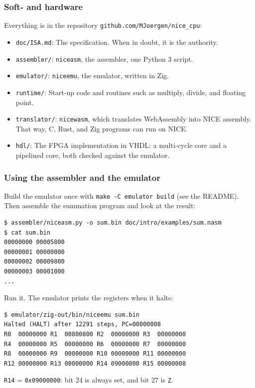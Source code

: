 \documentclass{beamer}
\newcommand{\code}[1]{\texttt{#1}}
\begin{document}
%
  \begin{frame}
   \frametitle{Soft- and hardware}
   Everything is in the repository \code{github.com/MJoergen/nice\_cpu}:
   \begin{itemize}
    \item \code{doc/ISA.md}: The specification. When in doubt, it is
     the authority.
    \item \code{assembler/}: \code{niceasm}, the assembler, one Python 3
     script.
    \item \code{emulator/}: \code{niceemu}, the emulator, written in Zig.
    \item \code{runtime/}: Start-up code and routines such as multiply,
     divide, and floating point.
    \item \code{translator/}: \code{nicewasm}, which translates
     WebAssembly into NICE assembly. That way, C, Rust, and Zig programs
     can run on NICE.
    \item \code{hdl/}: The FPGA implementation in VHDL: a multi-cycle
     core and a pipelined core, both checked against the emulator.
   \end{itemize}
  \end{frame}
%
  \begin{frame}[fragile]
   \frametitle{Using the assembler and the emulator}
   Build the emulator once with \code{make -C emulator build} (see the
   README). Then assemble the summation program and look at the result:
   {\footnotesize
   \begin{verbatim}
$ assembler/niceasm.py -o sum.bin doc/intro/examples/sum.nasm
$ cat sum.bin
00000000 00005800
00000001 00000000
00000002 00009800
00000003 00001000
...
   \end{verbatim}
   }
   Run it. The emulator prints the registers when it halts:
   {\footnotesize
   \begin{verbatim}
$ emulator/zig-out/bin/niceemu sum.bin
Halted (HALT) after 12291 steps, PC=00000008
R0  00000000 R1  00800800 R2  00000000 R3  00000000
R4  00000000 R5  00000000 R6  00000000 R7  00000000
R8  00000000 R9  00000000 R10 00000000 R11 00000000
R12 00000000 R13 00000000 R14 09000000 R15 00000008
   \end{verbatim}
   }
   \code{R14} = \code{0x09000000}: bit 24 is always set, and bit 27 is
   \code{Z}.
  \end{frame}
%
\end{document}
